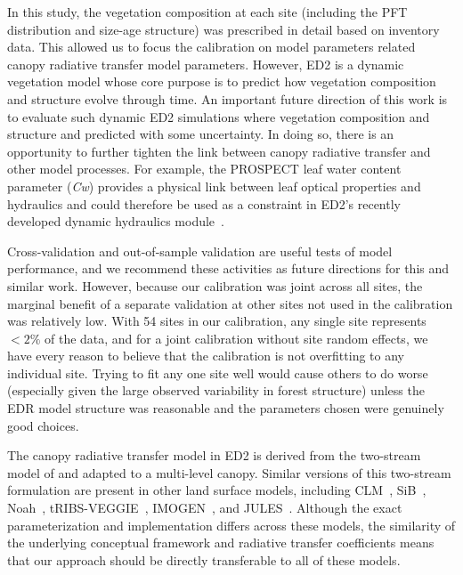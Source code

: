 In this study, the vegetation composition at each site (including the PFT distribution and size-age structure) was prescribed in detail based on inventory data.
This allowed us to focus the calibration on model parameters related canopy radiative transfer model parameters.
However, ED2 is a dynamic vegetation model whose core purpose is to predict how vegetation composition and structure evolve through time.
An important future direction of this work is to evaluate such dynamic ED2 simulations where vegetation composition and structure and predicted with some uncertainty.
In doing so, there is an opportunity to further tighten the link between canopy radiative transfer and other model processes.
For example, the PROSPECT leaf water content parameter (\emph{Cw}) provides a physical link between leaf optical properties and hydraulics and could therefore be used as a constraint in ED2's recently developed dynamic hydraulics module~\citep{xu2021leaf}.

Cross-validation and out-of-sample validation are useful tests of model performance, and we recommend these activities as future directions for this and similar work.
However, because our calibration was joint across all sites, the marginal benefit of a separate validation at other sites not used in the calibration was relatively low.
With 54 sites in our calibration, any single site represents $<2\%$ of the data, and for a joint calibration without site random effects, we have every reason to believe that the calibration is not overfitting to any individual site.
Trying to fit any one site well would cause others to do worse (especially given the large observed variability in forest structure) unless the EDR model structure was reasonable and the parameters chosen were genuinely good choices.

The canopy radiative transfer model in ED2 is derived from the two-stream model of \citet{sellers1985canopy} and adapted to a multi-level canopy.
Similar versions of this two-stream formulation are present in other land surface models, including CLM~\citep{clm45_note}, SiB~\citep{baker2008seasonal}, Noah~\citep{niu2011community}, tRIBS-VEGGIE~\citep{ivanov2008vegetationhydrology}, IMOGEN~\citep{huntingford2008quantifying}, and JULES~\citep{best_2011_joint}.
Although the exact parameterization and implementation differs across these models, the similarity of the underlying conceptual framework and radiative transfer coefficients means that our approach should be directly transferable to all of these models.

